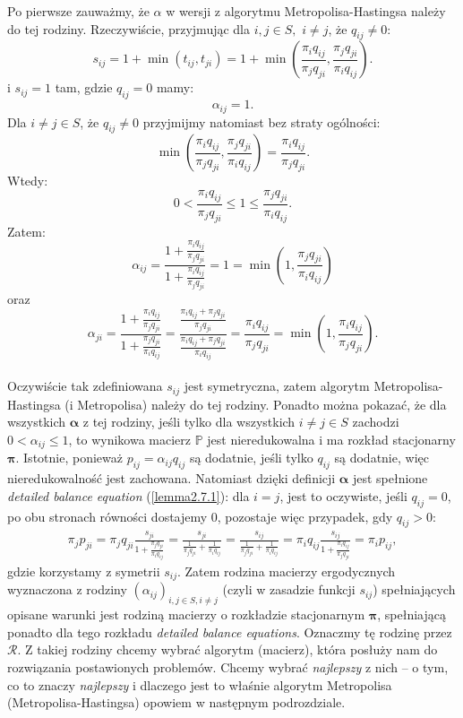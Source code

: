 \documentclass[a4paper]{article}
\theoremstyle{defn}
\theoremstyle{theorem}
\theoremstyle{lemma}
\theoremstyle{cor}
\theoremstyle{fact}
\begin{document}
Po pierwsze zauważmy, że $\alpha$ w wersji z algorytmu Metropolisa-Hastingsa należy do tej rodziny. Rzeczywiście, przyjmując dla $i,j \in S,\,\, i \neq j$, że $q_{ij} \neq 0$:
$$s_{ij} = 1 + \min(t_{ij}, t_{ji}) = 1 + \min\left(\frac{\pi_i q_{ij}}{\pi_j q_{ji}}, \frac{\pi_j q_{ji}}{\pi_i q_{ij}}\right).$$
i $s_{ij} = 1$ tam, gdzie $q_{ij} = 0$
mamy:
$$\alpha_{ij} = 1.$$
Dla $i \neq j \in S$, że $q_{ij} \neq 0$ przyjmijmy natomiast bez straty ogólności:
$$\min\left(\frac{\pi_i q_{ij}}{\pi_j q_{ji}}, \frac{\pi_j q_{ji}}{\pi_i q_{ij}}\right) = \frac{\pi_i q_{ij}}{\pi_j q_{ji}}.$$
Wtedy:
$$0 < \frac{\pi_i q_{ij}}{\pi_j q_{ji}} \leq 1 \leq \frac{\pi_j q_{ji}}{\pi_i q_{ij}}.$$
Zatem:
$$\alpha_{ij} = \frac{1 + \frac{\pi_i q_{ij}}{\pi_j q_{ji}}}{1 + \frac{\pi_i q_{ij}}{\pi_j q_{ji}}} = 1 = \min(1, \frac{\pi_j q_{ji}}{\pi_i q_{ij}})$$
oraz
$$\alpha_{ji} = \frac{1 + \frac{\pi_i q_{ij}}{\pi_j q_{ji}}}{1 + \frac{\pi_j q_{ji}}{\pi_i q_{ij}}} = \frac{\frac{\pi_i q_{ij} + \pi_j q_{ji}}{\pi_j q_{ji}}}{\frac{\pi_i q_{ij} + \pi_j q_{ji}}{\pi_i q_{ij}}} = \frac{\pi_i q_{ij}}{\pi_j q_{ji}} = \min(1, \frac{\pi_i q_{ij}}{\pi_j q_{ji}}).$$
\\
Oczywiście tak zdefiniowana $s_{ij}$ jest symetryczna, zatem algorytm Metropolisa-Hastingsa (i Metropolisa) należy do tej rodziny. Ponadto można pokazać, że dla wszystkich $\boldsymbol{\alpha}$ z tej rodziny, jeśli tylko dla wszystkich $i \neq j \in S$ zachodzi $0 < \alpha_{ij} \leq 1$, to wynikowa macierz $\mathbb{P}$ jest nieredukowalna i ma rozkład stacjonarny $\boldsymbol{\pi}$. Istotnie, ponieważ $p_{ij} = \alpha_{ij}q_{ij}$ są dodatnie, jeśli tylko $q_{ij}$ są dodatnie, więc nieredukowalność jest zachowana. Natomiast dzięki definicji $\boldsymbol{\alpha}$ jest spełnione \textit{detailed balance equation} (\ref{lemma2.7.1}): dla $i = j$, jest to oczywiste, jeśli $q_{ij} = 0$, po obu stronach równości dostajemy $0$, pozostaje więc przypadek, gdy $q_{ij} > 0$:
\begin{align*}
\pi_j p_{ji} = \pi_j q_{ji} \frac{s_{ji}}{1 + \frac{\pi_j q_{ji}}{\pi_i q_{ij}}} = \frac{s_{ji}}{\frac{1}{\pi_j q_{ji}} + \frac{1}{\pi_i q_{ij}}} = \frac{s_{ij}}{\frac{1}{\pi_j q_{ji}} + \frac{1}{\pi_i q_{ij}}} = \pi_i q_{ij} \frac{s_{ij}}{1 + \frac{\pi_i q_{ij}}{\pi_j q_{ji}}} = \pi_i p_{ij},
\end{align*}
gdzie korzystamy z symetrii $s_{ij}$. Zatem rodzina macierzy ergodycznych wyznaczona z rodziny $(\alpha_{ij})_{i,j \in S, i \neq j}$ (czyli w zasadzie funkcji $s_{ij}$) spełniających opisane warunki jest rodziną macierzy o rozkładzie stacjonarnym $\boldsymbol{\pi}$, spełniającą ponadto dla tego rozkładu \textit{detailed balance equations}. Oznaczmy tę rodzinę przez $\mathcal{R}$.
Z takiej rodziny chcemy wybrać algorytm (macierz), która posłuży nam do rozwiązania postawionych problemów. Chcemy wybrać \textit{najlepszy} z nich – o tym, co to znaczy \textit{najlepszy} i dlaczego jest to właśnie algorytm Metropolisa (Metropolisa-Hastingsa) opowiem w następnym podrozdziale.
\end{document}
